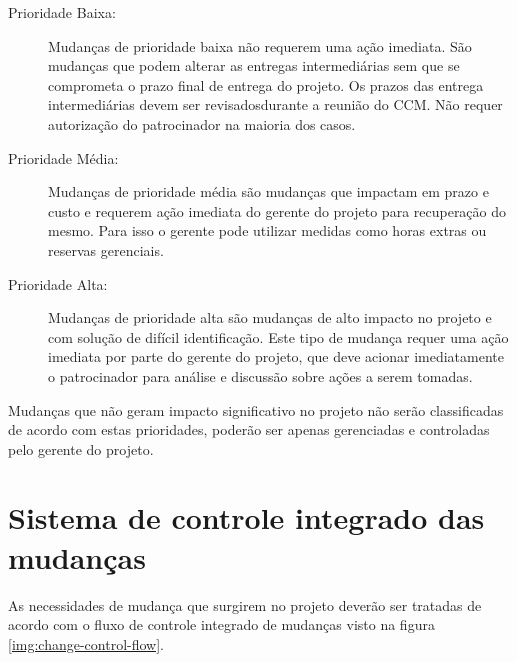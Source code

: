 \begin{description}
	\item[Prioridade Baixa:] Mudanças de prioridade baixa não requerem uma ação imediata. São mudanças que podem alterar as entregas intermediárias sem que se comprometa o prazo final de entrega do projeto. Os prazos das entrega intermediárias devem ser revisadosdurante a reunião do CCM. Não requer autorização do patrocinador na maioria dos casos.
	\item[Prioridade Média:] Mudanças de prioridade média são mudanças que impactam em prazo e custo e requerem ação imediata do gerente do projeto para recuperação do mesmo. Para isso o gerente pode utilizar medidas como horas extras ou reservas gerenciais.
	\item[Prioridade Alta:] Mudanças de prioridade alta são mudanças de alto impacto no projeto e com solução de difícil identificação. Este tipo de mudança requer uma ação imediata por parte do gerente do projeto, que deve acionar imediatamente o patrocinador para análise e discussão sobre ações a serem tomadas.
\end{description}

Mudanças que não geram impacto significativo no projeto não serão classificadas de acordo com estas prioridades, poderão ser apenas gerenciadas e controladas pelo gerente do projeto.

\section{Sistema de controle integrado das mudanças}
\label{sec:change-control-system}

As necessidades de mudança que surgirem no projeto deverão ser tratadas de acordo com o fluxo de controle integrado de mudanças visto na figura \ref{img:change-control-flow}.

